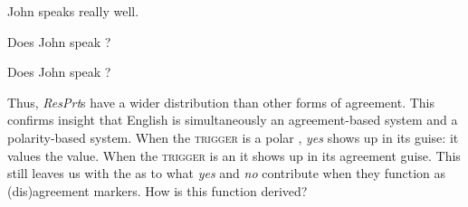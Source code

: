 \documentclass[output=paper]{LSP/langsci}
\begin{document}
\ea\label{ex:wiltschko:22}
\settowidth{}
\begin{xlist}
 {John speaks  really well.} 
\begin{xlisti}
\ex{}            
\ex{}        
\ex{}       
\ex{} 
\end{xlisti}
\end{xlist}
\z


\ea\label{ex:wiltschko:23}
\settowidth{}
\begin{xlist}
  Does John speak ?
\begin{xlisti}
\end{xlisti}
\end{xlist}

\z

\ea\label{ex:wiltschko:24}
\settowidth{}
\begin{xlist}
  Does John speak ? 
\begin{xlisti}
\end{xlisti}
\end{xlist}
\z

Thus, \textit{ResPrt}s have a wider distribution than other forms of agreement. This confirms  insight that English is simultaneously an agreement-based system and a polarity-based system. When the \textsc{trigger} is a polar , \textit{yes} shows up in its  guise: it values the  value.
When the \textsc{trigger} is an  it shows up in its agreement guise.
This still leaves us with the  as to what \textit{yes} and \textit{no} contribute when they function as (dis)agreement markers. How is this function derived? 
\end{document}
